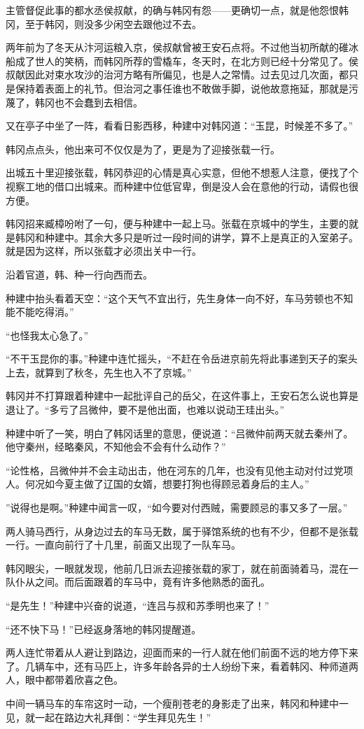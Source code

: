 主管督促此事的都水丞侯叔献，的确与韩冈有怨——更确切一点，就是他怨恨韩冈，至于韩冈，则没多少闲空去跟他过不去。

两年前为了冬天从汴河运粮入京，侯叔献曾被王安石点将。不过他当初所献的碓冰船成了世人的笑柄，而韩冈所荐的雪橇车，冬天时，在北方则已经十分常见了。侯叔献因此对束水攻沙的治河方略有所偏见，也是人之常情。过去见过几次面，都只是保持着表面上的礼节。但治河之事任谁也不敢做手脚，说他故意拖延，那就是污蔑了，韩冈也不会蠢到去相信。

又在亭子中坐了一阵，看看日影西移，种建中对韩冈道：“玉昆，时候差不多了。”

韩冈点点头，他出来可不仅仅是为了，更是为了迎接张载一行。

出城五十里迎接张载，韩冈恭迎的心情是真心实意，但他不想惹人注意，便找了个视察工地的借口出城来。而种建中位低官卑，倒是没人会在意他的行动，请假也很方便。

韩冈招来臧樟吩咐了一句，便与种建中一起上马。张载在京城中的学生，主要的就是韩冈和种建中。其余大多只是听过一段时间的讲学，算不上是真正的入室弟子。就是因为这样，所以张载才必须出关中一行。

沿着官道，韩、种一行向西而去。

种建中抬头看着天空：“这个天气不宜出行，先生身体一向不好，车马劳顿也不知能不能吃得消。”

“也怪我太心急了。”

“不干玉昆你的事。”种建中连忙摇头，“不赶在令岳进京前先将此事递到天子的案头上去，就算到了秋冬，先生也入不了京城。”

韩冈并不打算跟着种建中一起批评自己的岳父，在这件事上，王安石怎么说也算是退让了。“多亏了吕微仲，要不是他出面，也难以说动王珪出头。”

种建中听了一笑，明白了韩冈话里的意思，便说道：“吕微仲前两天就去秦州了。他守秦州，经略秦风，不知他会不会有什么动作？”

“论性格，吕微仲并不会主动出击，他在河东的几年，也没有见他主动对付过党项人。何况如今夏主做了辽国的女婿，想要打狗也得顾忌着身后的主人。”

”说得也是啊。”种建中闻言一叹，“如今要对付西贼，需要顾忌的事又多了一层。”

两人骑马西行，从身边过去的车马无数，属于驿馆系统的也有不少，但都不是张载一行。一直向前行了十几里，前面又出现了一队车马。

韩冈眼尖，一眼就发现，他前几日派去迎接张载的家丁，就在前面骑着马，混在一队仆从之间。而后面跟着的车马中，竟有许多他熟悉的面孔。

“是先生！”种建中兴奋的说道，“连吕与叔和苏季明也来了！”

“还不快下马！”已经返身落地的韩冈提醒道。

两人连忙带着从人避让到路边，迎面而来的一行人就在他们前面不远的地方停下来了。几辆车中，还有马匹上，许多年龄各异的士人纷纷下来，看着韩冈、种师道两人，眼中都带着欣喜之色。

中间一辆马车的车帘这时一动，一个瘦削苍老的身影走了出来，韩冈和种建中一见，就一起在路边大礼拜倒：“学生拜见先生！”

